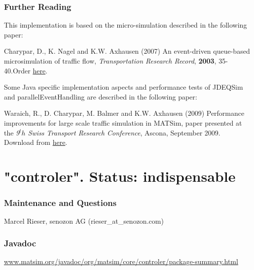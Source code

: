 \documentclass[a4paper,11pt]{report}
\begin{document}
\subsubsection{Further Reading}

This implementation is based on the micro-simulation described in the following paper:

Charypar, D., K. Nagel and K.W. Axhausen (2007) An event-driven queue-based microsimulation of traffic flow, \emph{Transportation Research Record}, \textbf{2003}, 35-40.Order \href{http://trb.metapress.com/content/j2118065485r4611/?p=4f63e25a261d48d99eeebea19b494e24&amp;pi=0}{here}.

Some  Java specific implementation aspects and performance tests of JDEQSim  and parallelEventHandling are described in the following paper:

Waraich,  R., D. Charypar, M. Balmer and K.W. Axhausen (2009) Performance  improvements for large scale traffic simulation in MATSim, paper  presented at the \emph{9$^th$ Swiss Transport Research Conference}, Ascona, September 2009. Download from \href{http://www.ivt.ethz.ch/vpl/publications/reports/ab565.pdf}{here}.


















\vfill\eject
\section{"controler". Status: indispensable}

\subsubsection{\textbf{Maintenance and Questions}}

Marcel Rieser, senozon AG (rieser\_at\_senozon.com)

\subsubsection{\textbf{Javadoc}}

\href{http://www.matsim.org/javadoc/org/matsim/core/controler/package-summary.html}{www.matsim.org/javadoc/org/matsim/core/controler/package-summary.html}
\end{document}
